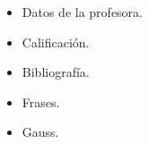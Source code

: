 \begin{itemize}
  \item Datos de la profesora.
  \item Calificación.
  \item Bibliografía.
  \item Frases.
  \item Gauss.
\end{itemize}

